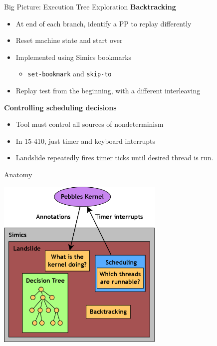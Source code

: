 \documentclass[xcolor=dvipsnames]{beamer}
\begin{document}
\begin{frame}{Big Picture: Execution Tree Exploration}
	\textbf{Backtracking}
	\begin{itemize}
		\item At end of each branch, identify a PP to replay differently
		\item Reset machine state and start over
		\item Implemented using Simics bookmarks
			\begin{itemize}
				\item {\tt set-bookmark} and {\tt skip-to}
			\end{itemize}
		\item Replay test from the beginning, with a different interleaving
	\end{itemize}
	\pause
	\linegap

	{\bf Controlling scheduling decisions}
	\begin{itemize}
		\item Tool must control all sources of nondeterminism
		\item In 15-410, just timer and keyboard interrupts
		\item Landslide repeatedly fires timer ticks until desired thread is run.
	\end{itemize}
\end{frame}


\begin{frame}{Anatomy}
	\begin{center}
	\includegraphics[width=0.6\textwidth]{landslide.png}
	\end{center}
\end{frame}
\end{document}
